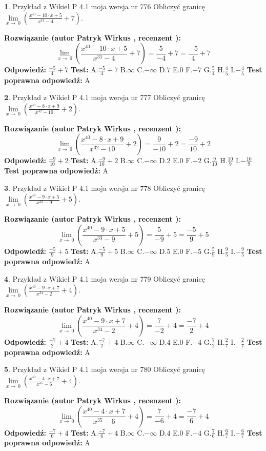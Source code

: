 \documentclass[12pt, a4paper]{article}
\theoremstyle{definition} %
\newtheorem{zad}{}
\newcommand{\zadStart}[1]{\begin{zad}#1\newline}
\newcommand{\zadStop}{\end{zad}}
\newcommand{\rozwStart}[2]{\noindent \textbf{Rozwiązanie (autor #1 , recenzent #2): }\newline}
\newcommand{\rozwStop}{\newline}
\newcommand{\odpStart}{\noindent \textbf{Odpowiedź:}\newline}
\newcommand{\odpStop}{\newline}
\newcommand{\testStart}{\noindent \textbf{Test:}\newline}
\newcommand{\testStop}{\newline}
\newcommand{\kluczStart}{\noindent \textbf{Test poprawna odpowiedź:}\newline}
\newcommand{\kluczStop}{\newline}
\begin{document}
\zadStart{Przykład z Wikieł P 4.1 moja wersja nr 776}
Obliczyć granicę $\lim\limits_{x\to\ 0}(\frac{x^{40}-10 \cdot x +5}{x^{31}-4}+7)$.
\zadStop
\rozwStart{Patryk Wirkus}{}
$$\lim\limits_{x\to\ 0}(\frac{x^{40}-10 \cdot x +5}{x^{31}-4}+7)=\frac{5}{-4}+7=\frac{-5}{4}+7$$
\rozwStop
\odpStart
$\frac{-5}{4}+7$
\odpStop
\testStart
A.$\frac{-5}{4}+7$
B.$\infty$
C.$-\infty$
D.$7$
E.$0$
F.$-7$
G.$\frac{5}{4}$
H.$\frac{4}{5}$
I.$-\frac{4}{5}$
\testStop
\kluczStart
A
\kluczStop



\zadStart{Przykład z Wikieł P 4.1 moja wersja nr 777}
Obliczyć granicę $\lim\limits_{x\to\ 0}(\frac{x^{40}-8 \cdot x +9}{x^{32}-10}+2)$.
\zadStop
\rozwStart{Patryk Wirkus}{}
$$\lim\limits_{x\to\ 0}(\frac{x^{40}-8 \cdot x +9}{x^{32}-10}+2)=\frac{9}{-10}+2=\frac{-9}{10}+2$$
\rozwStop
\odpStart
$\frac{-9}{10}+2$
\odpStop
\testStart
A.$\frac{-9}{10}+2$
B.$\infty$
C.$-\infty$
D.$2$
E.$0$
F.$-2$
G.$\frac{9}{10}$
H.$\frac{10}{9}$
I.$-\frac{10}{9}$
\testStop
\kluczStart
A
\kluczStop



\zadStart{Przykład z Wikieł P 4.1 moja wersja nr 778}
Obliczyć granicę $\lim\limits_{x\to\ 0}(\frac{x^{40}-9 \cdot x +5}{x^{33}-9}+5)$.
\zadStop
\rozwStart{Patryk Wirkus}{}
$$\lim\limits_{x\to\ 0}(\frac{x^{40}-9 \cdot x +5}{x^{33}-9}+5)=\frac{5}{-9}+5=\frac{-5}{9}+5$$
\rozwStop
\odpStart
$\frac{-5}{9}+5$
\odpStop
\testStart
A.$\frac{-5}{9}+5$
B.$\infty$
C.$-\infty$
D.$5$
E.$0$
F.$-5$
G.$\frac{5}{9}$
H.$\frac{9}{5}$
I.$-\frac{9}{5}$
\testStop
\kluczStart
A
\kluczStop



\zadStart{Przykład z Wikieł P 4.1 moja wersja nr 779}
Obliczyć granicę $\lim\limits_{x\to\ 0}(\frac{x^{40}-9 \cdot x +7}{x^{34}-2}+4)$.
\zadStop
\rozwStart{Patryk Wirkus}{}
$$\lim\limits_{x\to\ 0}(\frac{x^{40}-9 \cdot x +7}{x^{34}-2}+4)=\frac{7}{-2}+4=\frac{-7}{2}+4$$
\rozwStop
\odpStart
$\frac{-7}{2}+4$
\odpStop
\testStart
A.$\frac{-7}{2}+4$
B.$\infty$
C.$-\infty$
D.$4$
E.$0$
F.$-4$
G.$\frac{7}{2}$
H.$\frac{2}{7}$
I.$-\frac{2}{7}$
\testStop
\kluczStart
A
\kluczStop



\zadStart{Przykład z Wikieł P 4.1 moja wersja nr 780}
Obliczyć granicę $\lim\limits_{x\to\ 0}(\frac{x^{40}-4 \cdot x +7}{x^{35}-6}+4)$.
\zadStop
\rozwStart{Patryk Wirkus}{}
$$\lim\limits_{x\to\ 0}(\frac{x^{40}-4 \cdot x +7}{x^{35}-6}+4)=\frac{7}{-6}+4=\frac{-7}{6}+4$$
\rozwStop
\odpStart
$\frac{-7}{6}+4$
\odpStop
\testStart
A.$\frac{-7}{6}+4$
B.$\infty$
C.$-\infty$
D.$4$
E.$0$
F.$-4$
G.$\frac{7}{6}$
H.$\frac{6}{7}$
I.$-\frac{6}{7}$
\testStop
\kluczStart
A
\kluczStop
\end{document}
